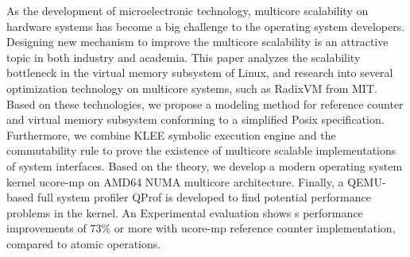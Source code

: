 
\begin{eabstract} 
	
	As the development of microelectronic technology, multicore scalability on hardware systems has become a big challenge to the operating system developers.  Designing new mechanism to improve the multicore scalability is an attractive topic in both industry and academia.
	This paper analyzes the scalability bottleneck in the virtual memory subsystem of Linux, and research into several optimization technology on multicore 
	systems, such as RadixVM from MIT. Based on these technologies, we propose a modeling method for reference counter and
	virtual memory subsystem conforming to a simplified Posix specification.  Furthermore, we combine KLEE symbolic execution engine and the commutability rule 
	to prove the existence of multicore scalable implementations of system interfaces. Based on the theory, we develop a modern operating system kernel ucore-mp on
	AMD64 NUMA multicore  architecture. Finally, a QEMU-based full system profiler QProf is developed to find potential performance problems in the kernel. An Experimental evaluation shows s performance improvements of 73\% or more with ucore-mp reference counter implementation, compared to atomic operations.
\end{eabstract}

